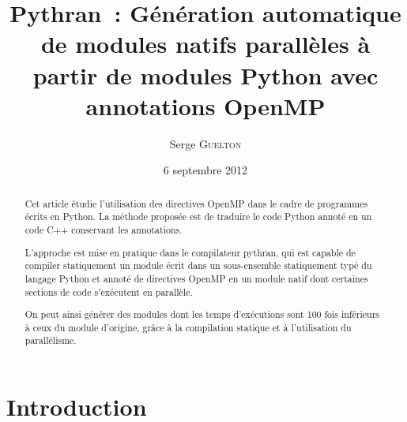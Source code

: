 \documentclass[renpar]{compas2013}
\begin{document}
\title{Pythran~: Génération automatique de modules natifs parallèles à
partir de modules Python avec annotations OpenMP}

\author{Serge \textsc{Guelton}}%

\address{École Normale Supérieure,\\
Département d'informatique\\
45 rue d'Ulm, F-75230 Paris Cedex 05 -- France\\
serge.guelton@telecom-bretagne.eu}

\date{6 septembre 2012}

\maketitle

\begin{abstract}
  Cet article étudie l'utilisation des directives OpenMP dans le cadre de
  programmes écrits en Python. La méthode proposée est de traduire le
  code Python annoté en un code C++ conservant les annotations.
  
  L'approche est mise en pratique dans le compilateur pythran, qui est
  capable de compiler statiquement un module écrit dans un sous-ensemble
  statiquement typé du langage Python et annoté de directives OpenMP en un
  module natif dont certaines sections de code s'exécutent en parallèle. 

  On peut ainsi générer des modules dont les temps d'exécutions sont 100
  fois inférieurs à ceux du module d'origine, grâce à la compilation
  statique et à l'utilisation du parallélisme.
  
\end{abstract}

	
\section{Introduction}
\end{document}
